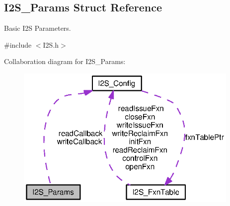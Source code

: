 \subsection{I2\+S\+\_\+\+Params Struct Reference}
\label{struct_i2_s___params}


Basic I2\+S Parameters.  




{\ttfamily \#include $<$I2\+S.\+h$>$}



Collaboration diagram for I2\+S\+\_\+\+Params\+:
\nopagebreak
\begin{figure}[H]
\begin{center}
\leavevmode
\includegraphics[width=305pt]{struct_i2_s___params__coll__graph}
\end{center}
\end{figure}
